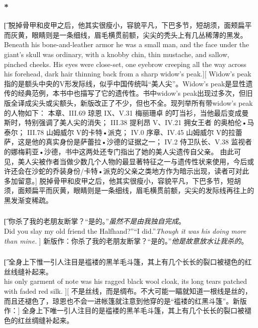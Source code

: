 \documentclass[12pt,a4paper]{article}
\begin{document}
\subsubsection{\color{red}*}\t[
	脱掉骨甲和皮甲之后，他其实很瘦小，容貌平凡，下巴多节，短胡须，面颊扁平而灰黄，眼睛则是一条细线，眉毛横贯前额，尖尖的秃头上有几丛稀薄的黑发。\\
	Beneath his bone-and-leather armor he was a small man, and the face under the giant's skull was ordinary, with a knobby chin, thin mustache, and sallow, pinched cheeks. His eyes were close-set, one eyebrow creeping all the way across his forehead, dark hair thinning back from a sharp widow's peak.][
	Widow's peak指的是额头中央的V形发际线，似乎中国传统叫“美人尖”。Widow's peak是显性遗传的经典范例，本书中也描写了它的遗传性。书中widow's peak出现过多次，但旧版全译成尖头或尖额头，新版改正了不少，但也不全。现列举所有带widow's peak的人物如下：
	本章、III.69 琼恩 IX、V.31 梅丽珊卓 的叮当衫，当他最后变成曼斯时，特别强调了美人尖的消失；
	III.38 提利昂 V、IV.21 拥女王者 的奥柏伦•马泰尔；
	III.78 山姆威尔 V的卡特•派克；
	IV.0 序章、IV.45 山姆威尔 V的拉蕾萨，这是他的真实身份是萨蕾拉•沙德的证据之一；
	IV.2 侍卫队长、V.38 监视者 的娜梅莉亚•沙德，书中这两处还专门指出了她的美人尖遗传自父亲。
	由此可见，美人尖被作者当做少数几个人物的最显著特征之一与遗传性状来使用，今后或许还会在沙蛇的乔装身份/卡特•派克的父亲之类地方作为暗示出现，读者可对此多加留意。]
	脱掉骨甲和皮甲之后，他其实很瘦小，容貌平凡，下巴多节，短胡须，面颊扁平而灰黄，眼睛则是一条细线，眉毛横贯前额，尖尖的发际线再往上的黑发渐变稀疏。
	
\subsubsection{}\t[
	你杀了我的老朋友断掌？“是的。”\emph{虽然不是由我独自完成}。\\
	Did you slay my old friend the Halfhand?”“I did.”\emph{Though it was his doing more than mine.} ]
	新版作：你杀了我的老朋友断掌？“是的。”\emph{他是故意放水让我杀的}。
	
\subsubsection{}\t[
	全身上下惟一引人注目是褴褛的黑羊毛斗篷，其上有几个长长的裂口被褪色的红丝线缝补起来。\\
	his only garment of note was his ragged black wool cloak, its long tears patched with faded red silk. ][
	不是丝线，而是绸布。不大可能一瞄就知道一根线是丝的，而且还褪色了，琼恩也不会一进帐篷就注意到他穿的是“褴褛的红黑斗篷”。新版作：]
	全身上下唯一引人注目的是褴褛的黑羊毛斗篷，其上有几个长长的裂口被褪色的红丝绸缝补起来。
	
\end{document}
